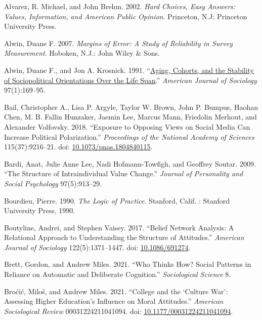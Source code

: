 \documentclass[
  11pt,
]{article}
\newlength{\cslhangindent}
\newenvironment{CSLReferences}[2] %
 {\begin{list}{}{%
  \setlength{\itemindent}{0pt}
  \setlength{\leftmargin}{0pt}
  \setlength{\parsep}{0pt}
  \ifodd #1
   \setlength{\leftmargin}{\cslhangindent}
   \setlength{\itemindent}{-1\cslhangindent}
  \fi
  \setlength{\itemsep}{#2\baselineskip}}}
 {\end{list}}
\begin{document}
\label{refs}
\begin{CSLReferences}{1}{1}
Alvarez, R. Michael, and John Brehm. 2002. \emph{Hard Choices, Easy
Answers: Values, Information, and {American} Public Opinion}. Princeton,
N.J: Princeton University Press.

Alwin, Duane F. 2007. \emph{Margins of {Error}: {A} {Study} of
{Reliability} in {Survey} {Measurement}}. Hoboken, N.J.: John Wiley \&
Sons.

Alwin, Duane F., and Jon A. Krosnick. 1991.
{``\href{https://www.jstor.org/stable/2781642}{Aging, {Cohorts}, and the
{Stability} of {Sociopolitical} {Orientations} {Over} the {Life}
{Span}}.''} \emph{American Journal of Sociology} 97(1):169--95.

Bail, Christopher A., Lisa P. Argyle, Taylor W. Brown, John P. Bumpus,
Haohan Chen, M. B. Fallin Hunzaker, Jaemin Lee, Marcus Mann, Friedolin
Merhout, and Alexander Volfovsky. 2018. {``Exposure to Opposing Views on
Social Media Can Increase Political Polarization.''} \emph{Proceedings
of the National Academy of Sciences} 115(37):9216--21. doi:
\href{https://doi.org/10.1073/pnas.1804840115}{10.1073/pnas.1804840115}.

Bardi, Anat, Julie Anne Lee, Nadi Hofmann-Towfigh, and Geoffrey Soutar.
2009. {``The Structure of Intraindividual Value Change.''} \emph{Journal
of Personality and Social Psychology} 97(5):913--29.

Bourdieu, Pierre. 1990. \emph{The Logic of Practice}. Stanford, Calif. :
Stanford University Press, 1990.

Boutyline, Andrei, and Stephen Vaisey. 2017. {``Belief {Network}
{Analysis}: {A} {Relational} {Approach} to {Understanding} the
{Structure} of {Attitudes}.''} \emph{American Journal of Sociology}
122(5):1371--1447. doi:
\href{https://doi.org/10.1086/691274}{10.1086/691274}.

Brett, Gordon, and Andrew Miles. 2021. {``Who {Thinks} {How}? {Social}
{Patterns} in {Reliance} on {Automatic} and {Deliberate} {Cognition}.''}
\emph{Sociological Science} 8.

Broćić, Miloš, and Andrew Miles. 2021. {``College and the {`{Culture}
{War}'}: {Assessing} {Higher} {Education}'s {Influence} on {Moral}
{Attitudes}.''} \emph{American Sociological Review} 00031224211041094.
doi:
\href{https://doi.org/10.1177/00031224211041094}{10.1177/00031224211041094}.


\end{CSLReferences}
\end{document}

